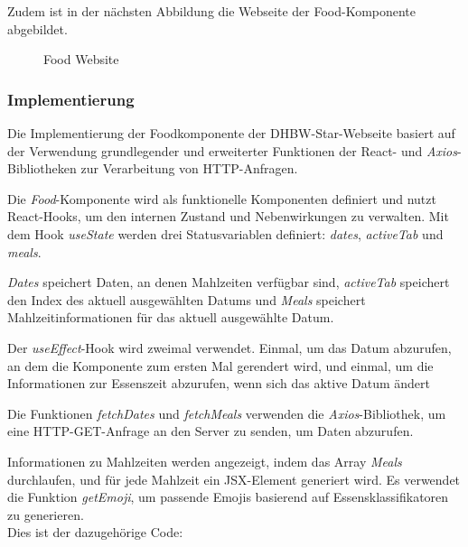 Zudem ist in der nächsten Abbildung die Webseite der Food-Komponente abgebildet.
\begin{figure}[htbp]
	\centering
	\caption{Food Website}
\end{figure}
\subsubsection{Implementierung}
Die Implementierung der Foodkomponente der DHBW-Star-Webseite basiert auf der Verwendung grundlegender und erweiterter Funktionen der React- und \emph{Axios}-Bibliotheken zur Verarbeitung von HTTP-Anfragen.

Die \emph{Food}-Komponente wird als funktionelle Komponenten definiert und nutzt React-Hooks, um den internen Zustand und Nebenwirkungen zu verwalten. Mit dem Hook \emph{useState} werden drei Statusvariablen definiert: \emph{dates}, \emph{activeTab} und \emph{meals}.

\emph{Dates} speichert Daten, an denen Mahlzeiten verfügbar sind, \emph{activeTab} speichert den Index des aktuell ausgewählten Datums und \emph{Meals} speichert Mahlzeitinformationen für das aktuell ausgewählte Datum.

Der \emph{useEffect}-Hook wird zweimal verwendet. Einmal, um das Datum abzurufen, an dem die Komponente zum ersten Mal gerendert wird, und einmal, um die Informationen zur Essenszeit abzurufen, wenn sich das aktive Datum ändert

Die Funktionen \emph{fetchDates} und \emph{fetchMeals} verwenden die \emph{Axios}-Bibliothek, um eine HTTP-GET-Anfrage an den Server zu senden, um Daten abzurufen.
 
Informationen zu Mahlzeiten werden angezeigt, indem das Array \emph{Meals} durchlaufen, und für jede Mahlzeit ein JSX-Element generiert wird. Es verwendet die Funktion \emph{getEmoji}, um passende Emojis basierend auf Essensklassifikatoren zu generieren.\\
Dies ist der dazugehörige Code:

